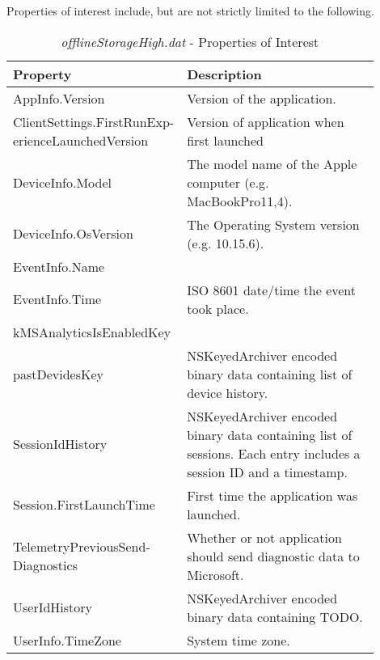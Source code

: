 \documentclass[journal]{IEEEtran}
\begin{document}
\noindent Properties of interest include, but are not strictly limited to the following.
\begin{table}[h!]
\caption{\textit{offlineStorageHigh.dat} - Properties of Interest}
\begin{tabular}{p{0.35\linewidth} | p{0.55\linewidth}}
Property  						& Description \\ \hline
AppInfo.Version 					& Version of the application.                                                                                        \\	
ClientSettings.FirstRunExp- erienceLaunchedVersion & Version of application when first launched                                                                         \\
DeviceInfo.Model                                & The model name of the Apple computer (e.g. MacBookPro11,4).                                                        \\
DeviceInfo.OsVersion                          & The Operating System version (e.g. 10.15.6).                                                                       \\
EventInfo.Name                                  &                                                                                                                    \\
EventInfo.Time                                   & ISO 8601 date/time the event took place.                                                                           \\
kMSAnalyticsIsEnabledKey                   &                                                                                                                    \\
pastDevidesKey                                  & NSKeyedArchiver encoded binary data containing list of device history.                                             \\
SessionIdHistory                                 & NSKeyedArchiver encoded binary data containing list of sessions. Each entry includes a session ID and a timestamp.\\
Session.FirstLaunchTime                     & First time the application was launched.                                                                           \\
TelemetryPreviousSend- Diagnostics                 & Whether or not application should send diagnostic data to Microsoft.                                               \\
UserIdHistory                                    & NSKeyedArchiver encoded binary data containing TODO.                                                               \\
UserInfo.TimeZone                                & System time zone.                                                                                                  \\
\end{tabular}
\end{table}
\end{document}
